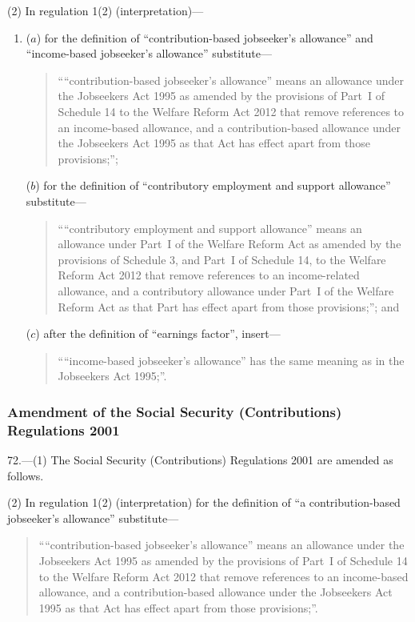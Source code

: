 \documentclass[12pt,a4paper]{article}
\begin{document}
(2) In regulation 1(2) (interpretation)—
\begin{enumerate}\item[]
($a$) for the definition of “contribution-based jobseeker’s allowance” and “income-based jobseeker’s allowance” substitute—
\begin{quotation}
““contribution-based jobseeker’s allowance” means an allowance under the Jobseekers Act 1995 as amended by the provisions of Part~I of Schedule 14 to the Welfare Reform Act 2012 that remove references to an income-based allowance, and a contribution-based allowance under the Jobseekers Act 1995 as that Act has effect apart from those provisions;”;
\end{quotation}

($b$) for the definition of “contributory employment and support allowance” substitute—
\begin{quotation}
““contributory employment and support allowance” means an allowance under Part~I of the Welfare Reform Act as amended by the provisions of Schedule 3, and Part~I of Schedule 14, to the Welfare Reform Act 2012 that remove references to an income-related allowance, and a contributory allowance under Part~I of the Welfare Reform Act as that Part has effect apart from those provisions;”; and
\end{quotation}

($c$) after the definition of “earnings factor”, insert—
\begin{quotation}
““income-based jobseeker’s allowance” has the same meaning as in the Jobseekers Act 1995;”.
\end{quotation}
\end{enumerate}

\subsubsection[72. Amendment of the Social Security (Contributions) Regulations 2001]{Amendment of the Social Security (Contributions) Regulations 2001}

72.—(1) The Social Security (Contributions) Regulations 2001 are amended as follows.

(2) In regulation 1(2) (interpretation) for the definition of “a contribution-based jobseeker’s allowance” substitute—
\begin{quotation}
\begin{sloppypar}
““contribution-based jobseeker’s allowance” means an allowance under the Jobseekers Act 1995 as amended by the provisions of Part~I of Schedule 14 to the Welfare Reform Act 2012 that remove references to an income-based allowance, and a contribution-based allowance under the Jobseekers Act 1995 as that Act has effect apart from those provisions;”.
\end{sloppypar}
\end{quotation}
\end{document}
